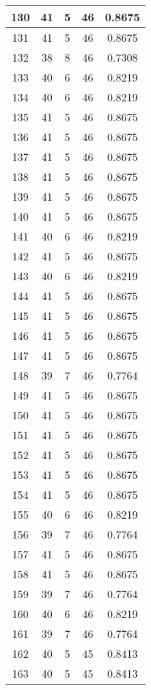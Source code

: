 \documentclass[letterpaper, 12pt]{article}
\begin{document}
\begin{longtable}{|c|c|c|c|c|}
\hline
130 & 41 & 5 & 46 & 0.8675 \\
\hline
131 & 41 & 5 & 46 & 0.8675 \\
\hline
132 & 38 & 8 & 46 & 0.7308 \\
\hline
133 & 40 & 6 & 46 & 0.8219 \\
\hline
134 & 40 & 6 & 46 & 0.8219 \\
\hline
135 & 41 & 5 & 46 & 0.8675 \\
\hline
136 & 41 & 5 & 46 & 0.8675 \\
\hline
137 & 41 & 5 & 46 & 0.8675 \\
\hline
138 & 41 & 5 & 46 & 0.8675 \\
\hline
139 & 41 & 5 & 46 & 0.8675 \\
\hline
140 & 41 & 5 & 46 & 0.8675 \\
\hline
141 & 40 & 6 & 46 & 0.8219 \\
\hline
142 & 41 & 5 & 46 & 0.8675 \\
\hline
143 & 40 & 6 & 46 & 0.8219 \\
\hline
144 & 41 & 5 & 46 & 0.8675 \\
\hline
145 & 41 & 5 & 46 & 0.8675 \\
\hline
146 & 41 & 5 & 46 & 0.8675 \\
\hline
147 & 41 & 5 & 46 & 0.8675 \\
\hline
148 & 39 & 7 & 46 & 0.7764 \\
\hline
149 & 41 & 5 & 46 & 0.8675 \\
\hline
150 & 41 & 5 & 46 & 0.8675 \\
\hline
151 & 41 & 5 & 46 & 0.8675 \\
\hline
152 & 41 & 5 & 46 & 0.8675 \\
\hline
153 & 41 & 5 & 46 & 0.8675 \\
\hline
154 & 41 & 5 & 46 & 0.8675 \\
\hline
155 & 40 & 6 & 46 & 0.8219 \\
\hline
156 & 39 & 7 & 46 & 0.7764 \\
\hline
157 & 41 & 5 & 46 & 0.8675 \\
\hline
158 & 41 & 5 & 46 & 0.8675 \\
\hline
159 & 39 & 7 & 46 & 0.7764 \\
\hline
160 & 40 & 6 & 46 & 0.8219 \\
\hline
161 & 39 & 7 & 46 & 0.7764 \\
\hline
162 & 40 & 5 & 45 & 0.8413 \\
\hline
163 & 40 & 5 & 45 & 0.8413 \\

\end{longtable}
\end{document}
